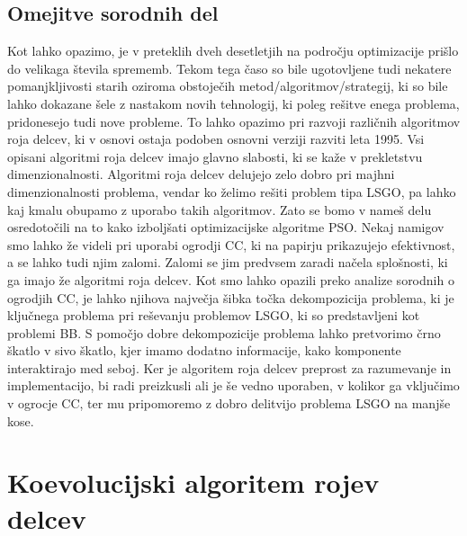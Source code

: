 \section{Omejitve sorodnih del}

Kot lahko opazimo, je v preteklih dveh desetletjih na področju optimizacije prišlo do velikaga števila sprememb.
Tekom tega časo so bile ugotovljene tudi nekatere pomanjkljivosti starih oziroma obstoječih metod/algoritmov/strategij, ki so bile lahko dokazane šele z nastakom novih tehnologij, ki poleg rešitve enega problema, pridonesejo tudi nove probleme.
To lahko opazimo pri razvoji različnih algoritmov roja delcev, ki v osnovi ostaja podoben osnovni verziji razviti leta 1995.
Vsi opisani algoritmi roja delcev imajo glavno slabosti, ki se kaže v prekletstvu dimenzionalnosti.
Algoritmi roja delcev delujejo zelo dobro pri majhni dimenzionalnosti problema, vendar ko želimo rešiti problem tipa LSGO, pa lahko kaj kmalu obupamo z uporabo takih algoritmov.
Zato se bomo v nameš delu osredotočili na to kako izboljšati optimizacijske algoritme PSO.
Nekaj namigov smo lahko že videli pri uporabi ogrodji CC, ki na papirju prikazujejo efektivnost, a se lahko tudi njim zalomi.
Zalomi se jim predvsem zaradi načela splošnosti, ki ga imajo že algoritmi roja delcev.
Kot smo lahko opazili preko analize sorodnih o ogrodjih CC, je lahko njihova največja šibka točka dekompozicija problema, ki je ključnega problema pri reševanju problemov LSGO, ki so predstavljeni kot problemi BB.
S pomočjo dobre dekompozicije problema lahko pretvorimo črno škatlo v sivo škatlo, kjer imamo dodatno informacije, kako komponente interaktirajo med seboj.
Ker je algoritem roja delcev preprost za razumevanje in implementacijo, bi radi preizkusli ali je še vedno uporaben, v kolikor ga vključimo v ogrocje CC, ter mu pripomoremo z dobro delitvijo problema LSGO na manjše kose.

\chapter{Koevolucijski algoritem rojev delcev}\label{chap:algo}


